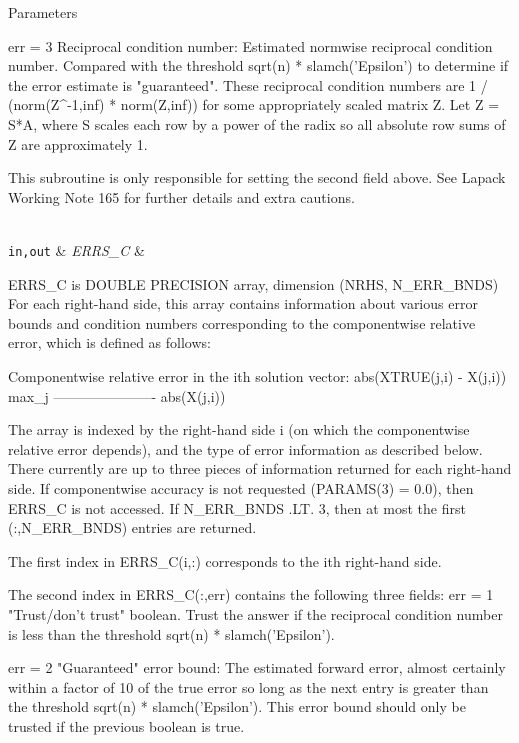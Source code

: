 \begin{DoxyParams}[1]{Parameters}
\begin{DoxyVerb}
     err = 3  Reciprocal condition number: Estimated normwise
              reciprocal condition number.  Compared with the threshold
              sqrt(n) * slamch('Epsilon') to determine if the error
              estimate is "guaranteed". These reciprocal condition
              numbers are 1 / (norm(Z^{-1},inf) * norm(Z,inf)) for some
              appropriately scaled matrix Z.
              Let Z = S*A, where S scales each row by a power of the
              radix so all absolute row sums of Z are approximately 1.

     This subroutine is only responsible for setting the second field
     above.
     See Lapack Working Note 165 for further details and extra
     cautions.\end{DoxyVerb}
\\
\hline
\mbox{\tt in,out}  & {\em E\+R\+R\+S\+\_\+\+C} & \begin{DoxyVerb}          ERRS_C is DOUBLE PRECISION array, dimension
                    (NRHS, N_ERR_BNDS)
     For each right-hand side, this array contains information about
     various error bounds and condition numbers corresponding to the
     componentwise relative error, which is defined as follows:

     Componentwise relative error in the ith solution vector:
                    abs(XTRUE(j,i) - X(j,i))
             max_j ----------------------
                         abs(X(j,i))

     The array is indexed by the right-hand side i (on which the
     componentwise relative error depends), and the type of error
     information as described below. There currently are up to three
     pieces of information returned for each right-hand side. If
     componentwise accuracy is not requested (PARAMS(3) = 0.0), then
     ERRS_C is not accessed.  If N_ERR_BNDS .LT. 3, then at most
     the first (:,N_ERR_BNDS) entries are returned.

     The first index in ERRS_C(i,:) corresponds to the ith
     right-hand side.

     The second index in ERRS_C(:,err) contains the following
     three fields:
     err = 1 "Trust/don't trust" boolean. Trust the answer if the
              reciprocal condition number is less than the threshold
              sqrt(n) * slamch('Epsilon').

     err = 2 "Guaranteed" error bound: The estimated forward error,
              almost certainly within a factor of 10 of the true error
              so long as the next entry is greater than the threshold
              sqrt(n) * slamch('Epsilon'). This error bound should only
              be trusted if the previous boolean is true.


\end{DoxyVerb}
\end{DoxyParams}
